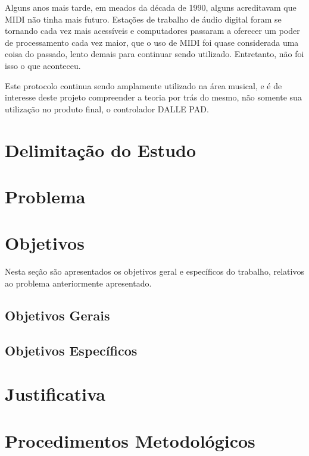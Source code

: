         Alguns anos mais tarde, em meados da década de 1990, alguns acreditavam que MIDI não tinha mais futuro. Estações de trabalho de áudio digital foram se tornando cada vez mais acessíveis e computadores passaram a oferecer um poder de processamento cada vez maior, que o uso de MIDI foi quase considerada uma coisa do passado, lento demais para continuar sendo utilizado. Entretanto, não foi isso o que aconteceu.
        
        Este protocolo continua sendo amplamente utilizado na área musical, e é de interesse deste projeto compreender a teoria por trás do mesmo, não somente sua utilização no produto final, o controlador DALLE PAD.
            
    \section{Delimitação do Estudo}



    \section{Problema}



    \section{Objetivos}

        Nesta seção são apresentados os objetivos geral e específicos do trabalho, relativos ao problema anteriormente apresentado.

        \subsection{Objetivos Gerais}



        \subsection{Objetivos Específicos}



    \section{Justificativa}



    \section{Procedimentos Metodológicos}



